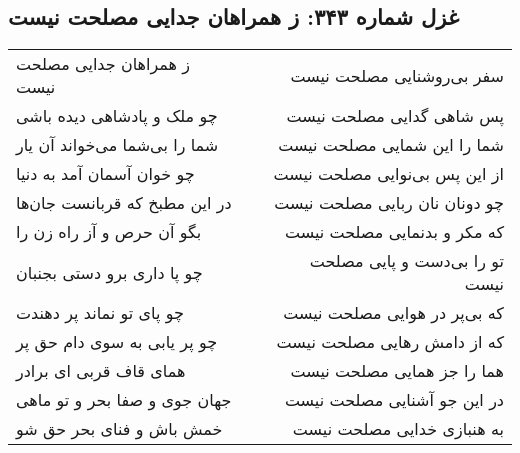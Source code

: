 \begin{center}
\section*{غزل شماره ۳۴۳: ز همراهان جدایی مصلحت نیست}
\label{sec:0343}
\begin{longtable}{l p{0.5cm} r}
ز همراهان جدایی مصلحت نیست
&&
سفر بی‌روشنایی مصلحت نیست
\\
چو ملک و پادشاهی دیده باشی
&&
پس شاهی گدایی مصلحت نیست
\\
شما را بی‌شما می‌خواند آن یار
&&
شما را این شمایی مصلحت نیست
\\
چو خوان آسمان آمد به دنیا
&&
از این پس بی‌نوایی مصلحت نیست
\\
در این مطبخ که قربانست جان‌ها
&&
چو دونان نان ربایی مصلحت نیست
\\
بگو آن حرص و آز راه زن را
&&
که مکر و بدنمایی مصلحت نیست
\\
چو پا داری برو دستی بجنبان
&&
تو را بی‌دست و پایی مصلحت نیست
\\
چو پای تو نماند پر دهندت
&&
که بی‌پر در هوایی مصلحت نیست
\\
چو پر یابی به سوی دام حق پر
&&
که از دامش رهایی مصلحت نیست
\\
همای قاف قربی ای برادر
&&
هما را جز همایی مصلحت نیست
\\
جهان جوی و صفا بحر و تو ماهی
&&
در این جو آشنایی مصلحت نیست
\\
خمش باش و فنای بحر حق شو
&&
به هنبازی خدایی مصلحت نیست
\\
\end{longtable}
\end{center}
